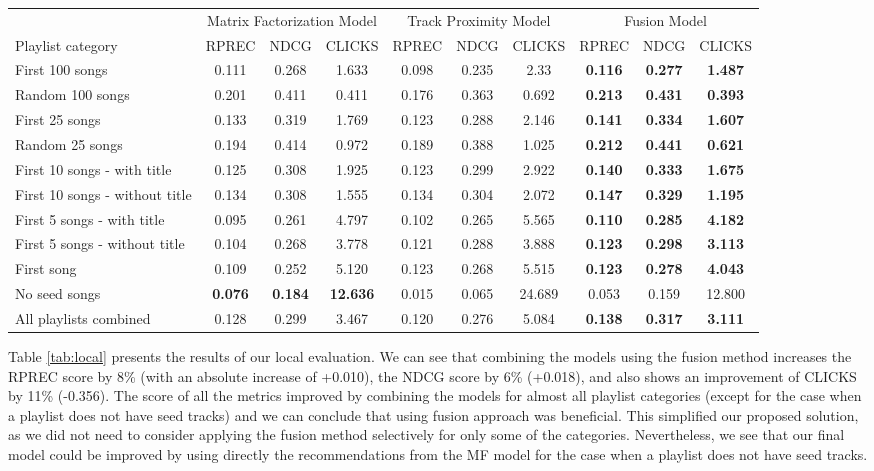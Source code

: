 \begin{table*}
  \caption{Local evaluation results. The best obtained results for each playlist category are marked in bold.}
  \label{tab:local}
  \begin{tabular}{lccccccccc}
    \toprule
&\multicolumn{3}{c}{Matrix Factorization Model}&\multicolumn{3}{c}{Track Proximity Model}&\multicolumn{3}{c}{Fusion Model}\\
Playlist category&RPREC&NDCG&CLICKS&RPREC&NDCG&CLICKS&RPREC&NDCG&CLICKS\\
    \midrule  
First 100 songs&0.111&0.268&1.633&0.098&0.235&2.33&\textbf{0.116}&\textbf{0.277}&\textbf{1.487}\\
Random 100 songs&0.201&0.411&0.411&0.176&0.363&0.692&\textbf{0.213}&\textbf{0.431}&\textbf{0.393}\\
First 25 songs&0.133&0.319&1.769&0.123&0.288&2.146&\textbf{0.141}&\textbf{0.334}&\textbf{1.607}\\
Random 25 songs&0.194&0.414&0.972&0.189&0.388&1.025&\textbf{0.212}&\textbf{0.441}&\textbf{0.621}\\
First 10 songs - with title&0.125&0.308&1.925&0.123&0.299&2.922&\textbf{0.140}&\textbf{0.333}&\textbf{1.675}\\
First 10 songs - without title&0.134&0.308&1.555&0.134&0.304&2.072&\textbf{0.147}&\textbf{0.329}&\textbf{1.195}\\
First 5 songs - with title&0.095&0.261&4.797&0.102&0.265&5.565&\textbf{0.110}&\textbf{0.285}&\textbf{4.182}\\
First 5 songs - without title&0.104&0.268&3.778&0.121&0.288&3.888&\textbf{0.123}&\textbf{0.298}&\textbf{3.113}\\
First song&0.109&0.252&5.120&0.123&0.268&5.515&\textbf{0.123}&\textbf{0.278}&\textbf{4.043}\\
No seed songs&\textbf{0.076}&\textbf{0.184}&\textbf{12.636}&0.015&0.065&24.689&0.053&0.159&12.800\\
\midrule 
All playlists combined&0.128&0.299&3.467&0.120&0.276&5.084&\textbf{0.138}&\textbf{0.317}&\textbf{3.111}\\
    \bottomrule
  \end{tabular}
\end{table*}

Table \ref{tab:local} presents the results of our local evaluation. We can see that combining the models using the fusion method increases the RPREC score by 8\% (with an absolute increase of +0.010), the NDCG score by 6\% (+0.018), and also shows an improvement of CLICKS by 11\% (-0.356). The score of all the metrics improved by combining the models for almost all playlist categories (except for the case when a playlist does not have seed tracks) and we can conclude that using fusion approach was beneficial. This simplified our proposed solution, as we did not need to consider applying the fusion method selectively for only some of the categories. Nevertheless, we see that our final model could be improved by using directly the recommendations from the MF model for the case when a playlist does not have seed tracks.

